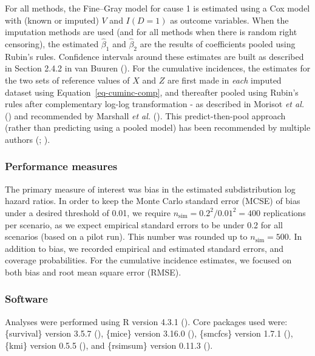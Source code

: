 \documentclass[
  letterpaper,
  paper=240mm:170mm,
  twoside=true,
  open=right,
  fontsize=10pt,
  pagesize=false,
  BCOR=15mm,
  DIV=14,
  headinclude=true,
  footinclude=false,
  headsepline=on]{scrbook}
\begin{document}
For all methods, the Fine--Gray model for cause 1 is estimated using a
Cox model with (known or imputed) \(V\) and \(I(D = 1)\) as outcome
variables. When the imputation methods are used (and for all methods
when there is random right censoring), the estimated \(\hat{\beta}_{1}\)
and \(\hat{\beta}_{2}\) are the results of coefficients pooled using
Rubin's rules. Confidence intervals around these estimates are built as
described in Section 2.4.2 in van Buuren
(). For the
cumulative incidences, the estimates for the two sets of reference
values of \(X\) and \(Z\) are first made in \emph{each} imputed dataset
using Equation~\ref{eq-cuminc-comp}, and thereafter pooled using Rubin's
rules after complementary log-log transformation - as described in
Morisot \emph{et al.}
() and recommended by
Marshall \emph{et al.}
(). This
predict-then-pool approach (rather than predicting using a pooled model)
has been recommended by multiple authors
(;
).

\subsubsection{Performance measures}\label{performance-measures-1}

The primary measure of interest was bias in the estimated
subdistribution log hazard ratios. In order to keep the Monte Carlo
standard error (MCSE) of bias under a desired threshold of 0.01, we
require \(n_{\text{sim}} = 0.2^2/0.01^2 = 400\) replications per
scenario, as we expect empirical standard errors to be under 0.2 for all
scenarios (based on a pilot run). This number was rounded up to
\(n_{\text{sim}} = 500\). In addition to bias, we recorded empirical and
estimated standard errors, and coverage probabilities. For the
cumulative incidence estimates, we focused on both bias and root mean
square error (RMSE).

\subsubsection{Software}\label{software-1}

Analyses were performed using R version 4.3.1
(). Core packages used were: \{survival\} version 3.5.7
(), \{mice\} version
3.16.0 (), \{smcfcs\} version 1.7.1
(), \{kmi\} version 0.5.5
(), and \{rsimsum\} version 0.11.3
().
\end{document}

